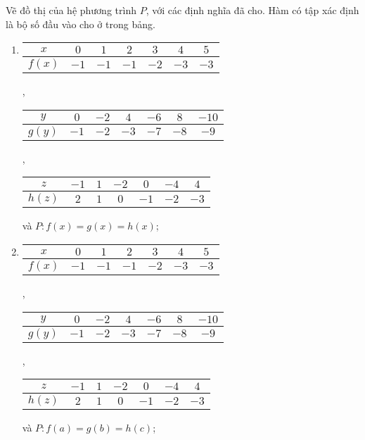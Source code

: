 \exercise[ex:hpt1] Vẽ đồ thị của hệ phương trình $P$, với các định nghĩa đã cho. Hàm có tập xác định là bộ số đầu vào cho ở trong bảng.
\begin{enumerate}
   \item 
   \begin{tabular}{|c|c|c|c|c|c|c|}
      \hline
      $x$ & $0$ & $1$ & $2$ & $3$ & $4$ & $5$ \\
      \hline
      $f(x)$ & $-1$ & $-1$ & $-1$ & $-2$ & $-3$ & $-3$\\
      \hline
   \end{tabular},
   \begin{tabular}{|c|c|c|c|c|c|c|}
      \hline
      $y$ & $0$ & $-2$ & $4$ & $-6$ & $8$ & $-10$\\
      \hline
      $g(y)$ & $-1$ & $-2$ & $-3$ & $-7$ & $-8$ & $-9$\\
      \hline
   \end{tabular},

   \noindent\begin{tabular}{|c|c|c|c|c|c|c|}
      \hline
      $z$ & $-1$ & $1$ & $-2$ & $0$ & $-4$ & $4$\\
      \hline
      $h(z)$ & $2$ & $1$ & $0$ & $-1$ & $-2$ & $-3$\\
      \hline
   \end{tabular} và $P:f(x) = g(x) = h(x)$;

   \item
   \begin{tabular}{|c|c|c|c|c|c|c|}
      \hline
      $x$ & $0$ & $1$ & $2$ & $3$ & $4$ & $5$ \\
      \hline
      $f(x)$ & $-1$ & $-1$ & $-1$ & $-2$ & $-3$ & $-3$\\
      \hline
   \end{tabular},
   \begin{tabular}{|c|c|c|c|c|c|c|}
      \hline
      $y$ & $0$ & $-2$ & $4$ & $-6$ & $8$ & $-10$\\
      \hline
      $g(y)$ & $-1$ & $-2$ & $-3$ & $-7$ & $-8$ & $-9$\\
      \hline
   \end{tabular},

   \noindent\begin{tabular}{|c|c|c|c|c|c|c|}
      \hline
      $z$ & $-1$ & $1$ & $-2$ & $0$ & $-4$ & $4$\\
      \hline
      $h(z)$ & $2$ & $1$ & $0$ & $-1$ & $-2$ & $-3$\\
      \hline
   \end{tabular} và $P:f(a) = g(b) = h(c)$;


\end{enumerate}
